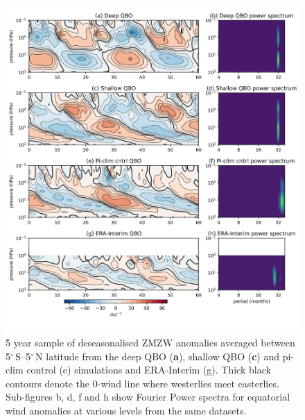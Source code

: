 \begin{figure}[h!]
\begin{center}
\noindent\includegraphics[width = \linewidth]{Figures/Figures-deepQBO/experiment_QBOs_anomalies.png}
\caption[Equatorial ZMZW anomaly time-height profiles from QBO experiments]{5 year sample of deseasonalised ZMZW anomalies averaged between 5$^{\circ}$\,S--5$^{\circ}$\,N latitude from the deep QBO (\textbf{a}), shallow QBO (\textbf{c}) and pi-clim control (e) simulations and ERA-Interim (g). Thick black contours denote the 0-wind line where westerlies meet easterlies. Sub-figures b, d, f and h show Fourier Power spectra for equatorial wind anomalies at various levels from the same datasets.}
\label{fig:experiment_QBOs_anomalies}
\end{center}
\end{figure}

